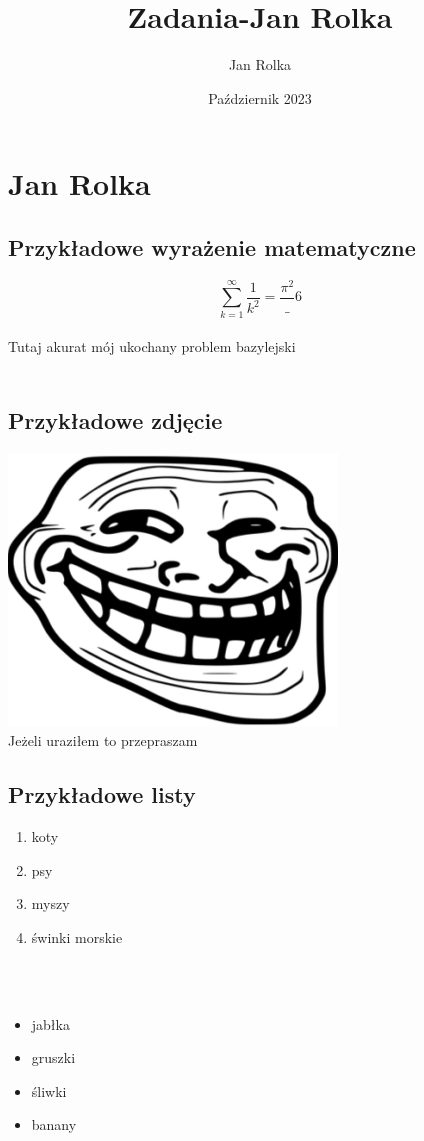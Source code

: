 \documentclass[a4paper]{article}
\title{Zadania-Jan Rolka}
\author{Jan Rolka}
\date{Październik 2023}
\begin{document}
\section{Jan Rolka}
\label{sec:Jan Rolka}

\subsection{Przykładowe wyrażenie matematyczne}

$$
\sum_{k=1}^{\infty}\frac{1}{k^2} = \frac{\pi^2}_{6}   
$$ \\

Tutaj akurat mój ukochany problem bazylejski
\\\\

\subsection{Przykładowe zdjęcie}

\includegraphics[scale=0.25]{pictures/ObrazkiJR/Trollface}\\

Jeżeli uraziłem to przepraszam

\subsection{Przykładowe listy}

\begin{enumerate}
    \item koty
    \item psy
    \item myszy
    \item świnki morskie
\end{enumerate}
\\\\
\begin{itemize}
    \item jabłka
    \item gruszki
    \item śliwki
    \item banany
\end{itemize}
\end{document}
